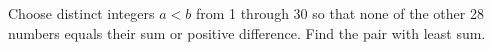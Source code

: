Choose distinct integers $a<b$ from 1 through 30 so that none of the other 28 numbers equals their sum or positive difference. Find the pair with least sum.

